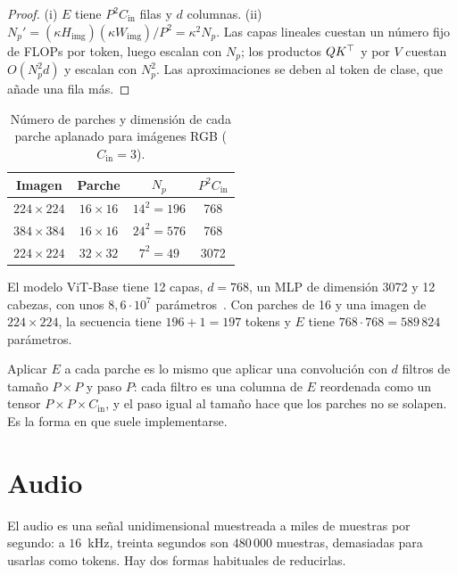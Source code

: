 \begin{proof}
(i) $E$ tiene $P^{2}C_{\mathrm{in}}$ filas y $d$ columnas. (ii) $N_p'=(\kappa H_{\mathrm{img}})(\kappa W_{\mathrm{img}})/P^{2}=\kappa^{2}N_p$. Las capas lineales cuestan un número fijo de FLOPs por token, luego escalan con $N_p$; los productos $QK^{\top}$ y por $V$ cuestan $O(N_p^{2}d)$ y escalan con $N_p^{2}$. Las aproximaciones se deben al token de clase, que añade una fila más.
\end{proof}

\begin{table}[ht]
\centering\small
\caption{Número de parches y dimensión de cada parche aplanado para imágenes RGB ($C_{\mathrm{in}}=3$).}\label{tab:vit}
\begin{tabular}{@{}cccc@{}}
\toprule
Imagen & Parche & $N_p$ & $P^{2}C_{\mathrm{in}}$ \\
\midrule
$224\times 224$ & $16\times 16$ & $14^{2}=196$ & 768 \\
$384\times 384$ & $16\times 16$ & $24^{2}=576$ & 768 \\
$224\times 224$ & $32\times 32$ & $7^{2}=49$ & 3072 \\
\bottomrule
\end{tabular}
\end{table}

El modelo ViT-Base tiene 12 capas, $d=768$, un MLP de dimensión 3072 y 12 cabezas, con unos $8{,}6\cdot 10^{7}$ parámetros~\cite[tabla~1]{vit}. Con parches de 16 y una imagen de $224\times 224$, la secuencia tiene $196+1=197$ tokens y $E$ tiene $768\cdot 768=589\,824$ parámetros.

\begin{observacion}
Aplicar $E$ a cada parche es lo mismo que aplicar una convolución con $d$ filtros de tamaño $P\times P$ y paso $P$: cada filtro es una columna de $E$ reordenada como un tensor $P\times P\times C_{\mathrm{in}}$, y el paso igual al tamaño hace que los parches no se solapen. Es la forma en que suele implementarse.
\end{observacion}

\section{Audio}

El audio es una señal unidimensional muestreada a miles de muestras por segundo: a $16$~kHz, treinta segundos son $480\,000$ muestras, demasiadas para usarlas como tokens. Hay dos formas habituales de reducirlas.

